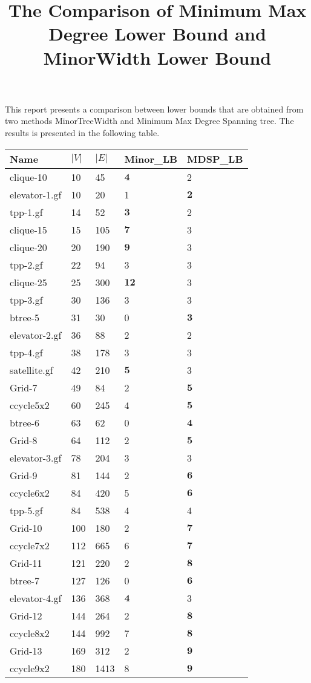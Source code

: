 \documentclass{article}
\title{The Comparison of Minimum Max Degree Lower Bound and MinorWidth Lower Bound}
\begin{document}
\maketitle
This report presents a comparison between lower bounds that are obtained from two methods MinorTreeWidth and Minimum Max Degree Spanning tree. The results is presented in the following table.
\begin{longtable}{|l |l |l |l |l |}
\hline
Name&$|V|$&$|E|$&Minor_LB&MDSP_LB\\
\hline
clique-10&10&45&$\mathbf{4}$&2\\
elevator-1.gf&10&20&1&$\mathbf{2}$\\
tpp-1.gf&14&52&$\mathbf{3}$&2\\
clique-15&15&105&$\mathbf{7}$&3\\
clique-20&20&190&$\mathbf{9}$&3\\
tpp-2.gf&22&94&3&3\\
clique-25&25&300&$\mathbf{12}$&3\\
tpp-3.gf&30&136&3&3\\
btree-5&31&30&0&$\mathbf{3}$\\
elevator-2.gf&36&88&2&2\\
tpp-4.gf&38&178&3&3\\
satellite.gf&42&210&$\mathbf{5}$&3\\
Grid-7&49&84&2&$\mathbf{5}$\\
ccycle5x2&60&245&4&$\mathbf{5}$\\
btree-6&63&62&0&$\mathbf{4}$\\
Grid-8&64&112&2&$\mathbf{5}$\\
elevator-3.gf&78&204&3&3\\
Grid-9&81&144&2&$\mathbf{6}$\\
ccycle6x2&84&420&5&$\mathbf{6}$\\
tpp-5.gf&84&538&4&4\\
Grid-10&100&180&2&$\mathbf{7}$\\
ccycle7x2&112&665&6&$\mathbf{7}$\\
Grid-11&121&220&2&$\mathbf{8}$\\
btree-7&127&126&0&$\mathbf{6}$\\
elevator-4.gf&136&368&$\mathbf{4}$&3\\
Grid-12&144&264&2&$\mathbf{8}$\\
ccycle8x2&144&992&7&$\mathbf{8}$\\
Grid-13&169&312&2&$\mathbf{9}$\\
ccycle9x2&180&1413&8&$\mathbf{9}$\\

\end{longtable}
\end{document}
